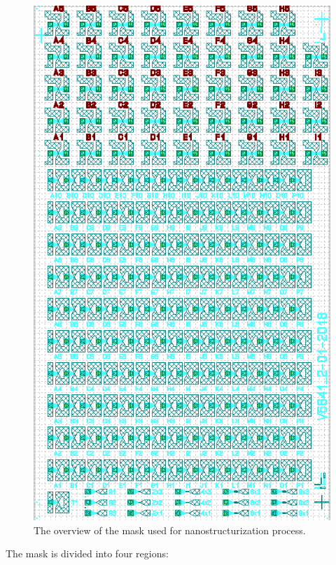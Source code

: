     \begin{figure}[H]
        \centering
        \includegraphics[width=0.4\paperwidth, angle=-90]{img/04/mask_all.png}
        \caption{The overview of the mask used for nanostructurization process.}
        \label{FabricationMaskAll}
    \end{figure}
    
    The mask is divided into four regions:
    
